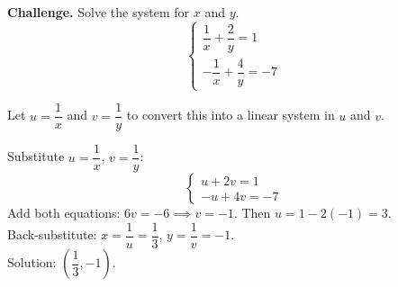 \documentclass{ximera}
\begin{document}
\begin{problem}
\textbf{Challenge.} Solve the system for $x$ and $y$.
$$\begin{cases} \dfrac{1}{x} + \dfrac{2}{y} = 1\\[6pt] -\dfrac{1}{x}+\dfrac{4}{y} = -7\end{cases}$$
\begin{hint}
Let $u = \dfrac{1}{x}$ and $v = \dfrac{1}{y}$ to convert this into a linear system in $u$ and $v$.
\end{hint}

\begin{solution}
Substitute $u=\dfrac{1}{x}$, $v=\dfrac{1}{y}$:
$$\begin{cases} u+2v=1 \\ -u+4v=-7 \end{cases}$$
Add both equations: $6v=-6 \implies v=-1$. Then $u=1-2(-1)=3$.\\
Back-substitute: $x=\dfrac{1}{u}=\dfrac{1}{3}$, $y=\dfrac{1}{v}=-1$.\\
Solution: $\left(\dfrac{1}{3},-1\right)$.
\end{solution}
\end{problem}
\end{document}
